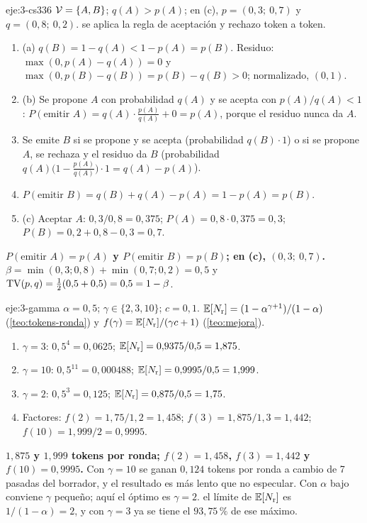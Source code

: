 \begin{solucion}{eje:3-cs336}
\datos $\mathcal{V}=\{A,B\}$; $q(A)>p(A)$; en (c), $p=(0{,}3;\allowbreak\ 0{,}7)$ y $q=(0{,}8;\allowbreak\ 0{,}2)$.
\planteamiento se aplica la regla de aceptación y rechazo token a token.
\pasos
\begin{enumerate}[label=\arabic*.]
  \item (a) $q(B)=1-q(A)<1-p(A)=p(B)$. Residuo: $\max(0,p(A)-q(A))=0$ y $\max(0,p(B)-q(B))=p(B)-q(B)>0$; normalizado, $(0,1)$.
  \item (b) Se propone $A$ con probabilidad $q(A)$ y se acepta con $p(A)/q(A)<1$: $P(\text{emitir }A)=q(A)\cdot\frac{p(A)}{q(A)}+0=p(A)$, porque el residuo nunca da $A$.
  \item Se emite $B$ si se propone y se acepta (probabilidad $q(B)\cdot 1$) o si se propone $A$, se rechaza y el residuo da $B$ (probabilidad $q(A)\bigl(1-\frac{p(A)}{q(A)}\bigr)\cdot 1=q(A)-p(A)$).
  \item $P(\text{emitir }B)=q(B)+q(A)-p(A)=1-p(A)=p(B)$.
  \item (c) Aceptar $A$: $0{,}3/0{,}8=0{,}375$; $P(A)=0{,}8\cdot 0{,}375=0{,}3$; $P(B)=0{,}2+0{,}8-0{,}3=0{,}7$.
\end{enumerate}
\resultado \textbf{$P(\text{emitir }A)=p(A)$ y $P(\text{emitir }B)=p(B)$; en (c), $(0{,}3;\allowbreak\ 0{,}7)$.}
\comprobacion $\beta=\min(0{,}3;0{,}8)+\min(0{,}7;0{,}2)=0{,}5$ y $\operatorname{TV}(p,q)=\frac12(0{,}5+0{,}5)=0{,}5=1-\beta$.
\end{solucion}

\begin{solucion}{eje:3-gamma}
\datos $\alpha=0{,}5$; $\gamma\in\{2,3,10\}$; $c=0{,}1$.
\planteamiento $\mathbb{E}[N_{\mathrm{r}}]=(1-\alpha^{\gamma+1})/(1-\alpha)$ (\cref{teo:tokens-ronda}) y $f(\gamma)=\mathbb{E}[N_{\mathrm{r}}]/(\gamma c+1)$ (\cref{teo:mejora}).
\pasos
\begin{enumerate}[label=\arabic*.]
  \item $\gamma=3$: $0{,}5^{4}=0{,}0625$; $\mathbb{E}[N_{\mathrm{r}}]=0{,}9375/0{,}5=1{,}875$.
  \item $\gamma=10$: $0{,}5^{11}=0{,}000488$; $\mathbb{E}[N_{\mathrm{r}}]=0{,}9995/0{,}5=1{,}999$.
  \item $\gamma=2$: $0{,}5^{3}=0{,}125$; $\mathbb{E}[N_{\mathrm{r}}]=0{,}875/0{,}5=1{,}75$.
  \item Factores: $f(2)=1{,}75/1{,}2=1{,}458$; $f(3)=1{,}875/1{,}3=1{,}442$; $f(10)=1{,}999/2=0{,}9995$.
\end{enumerate}
\resultado \textbf{$1{,}875$ y $1{,}999$ tokens por ronda; $f(2)=1{,}458$, $f(3)=1{,}442$ y $f(10)=0{,}9995$.} Con $\gamma=10$ se ganan $0{,}124$ tokens por ronda a cambio de 7 pasadas del borrador, y el resultado es más lento que no especular. Con $\alpha$ bajo conviene $\gamma$ pequeño; aquí el óptimo es $\gamma=2$.
\comprobacion el límite de $\mathbb{E}[N_{\mathrm{r}}]$ es $1/(1-\alpha)=2$, y con $\gamma=3$ ya se tiene el $93{,}75\,\%$ de ese máximo.
\end{solucion}

